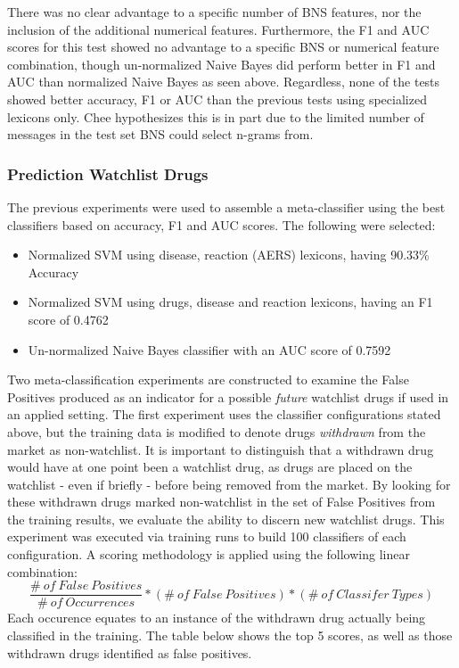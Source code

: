 \documentclass[twoside,11pt]{article}
\begin{document}
There was no clear advantage to a specific number of BNS features, nor the inclusion of the additional numerical features.  Furthermore, the F1 and AUC scores for this test showed no advantage to a specific BNS or numerical feature combination, though un-normalized Naive Bayes did perform better in F1 and AUC than normalized Naive Bayes as seen above. Regardless, none of the tests showed better accuracy, F1 or AUC than the previous tests using specialized lexicons only. Chee hypothesizes this is in part due to the limited number of messages in the test set BNS could select n-grams from.

\subsubsection{Prediction Watchlist Drugs}
The previous experiments were used to assemble a meta-classifier using the best classifiers based on accuracy, F1 and AUC scores. The following were selected:
\begin{itemize}
  \item Normalized SVM using disease, reaction (AERS) lexicons, having 90.33\% Accuracy
  \item Normalized SVM using drugs, disease and reaction lexicons, having an F1 score of 0.4762
  \item Un-normalized Naive Bayes classifier with an AUC score of 0.7592
\end{itemize}
Two meta-classification experiments are constructed to examine the False Positives produced as an indicator for a possible \textit{future} watchlist drugs if used in an applied setting. The first experiment uses the classifier configurations stated above, but the training data is modified to denote drugs \textit{withdrawn} from the market as non-watchlist. It is important to distinguish that a withdrawn drug would have at one point been a watchlist drug, as drugs are placed on the watchlist - even if briefly - before being removed from the market. By looking for these withdrawn drugs marked non-watchlist in the set of False Positives from the training results, we evaluate the ability to discern new watchlist drugs. This experiment was executed via training runs to build 100 classifiers of each configuration. A scoring methodology is applied using the following linear combination:
\[
  \frac{\#\ of\ False\ Positives}{\#\ of\ Occurrences} * (\#\ of\ False\ Positives) * (\#\ of\ Classifer\ Types)
\]
Each occurence equates to an instance of the withdrawn drug actually being classified in the training. The table below shows the top 5 scores, as well as  those withdrawn drugs identified as false positives.
\end{document}
